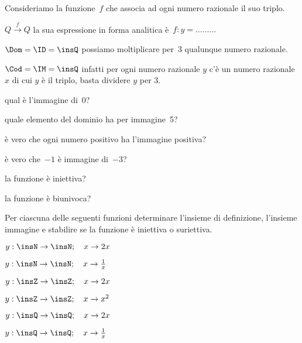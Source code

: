 \begin{esercizio}
 \label{ese:D.10}
Consideriamo la funzione~$f$ che associa ad ogni numero razionale il suo triplo.

$Q\overset{{f}}{{\rightarrow }}Q$ la sua espressione in forma
analitica è~$f: y = {\dots}{\dots}{\dots}$

$\Dom = \ID = \insQ$ possiamo moltiplicare per~3 qualunque numero razionale.

$\Cod = \IM =\insQ$ infatti per ogni numero razionale $y$ c'è un numero 
razionale $x$ di cui $y$ è il triplo, basta dividere $y$ per 3.
%
\vspace{-6pt}
\begin{enumeratea}
\item qual è l'immagine di~0?\dotfill
\item quale elemento del dominio ha per immagine~5?\dotfill
\item è vero che ogni numero positivo ha l'immagine positiva?\dotfill
\item è vero che~$-1$ è immagine di~$-3$?\dotfill
\item la funzione è iniettiva?
\item la funzione è biunivoca?
\end{enumeratea}
\end{esercizio}

\newpage %

\begin{esercizio}
 \label{ese:D.11}
Per ciascuna delle seguenti funzioni determinare l'insieme di definizione, 
l'insieme
immagine e stabilire se la funzione è iniettiva o suriettiva.
\begin{multicols}{3}
\begin{enumeratea}
\item $y:\insN\rightarrow\insN;\quad x \rightarrow 2x$
\item $y:\insN\rightarrow\insN;\quad x \rightarrow \frac{1}{x}$
\item $y:\insZ\rightarrow\insZ;\quad x \rightarrow 2x$
\item $y:\insZ\rightarrow\insZ;\quad x \rightarrow x^{2}$
\item $y:\insQ\rightarrow\insQ;\quad x \rightarrow 2x$
\item $y:\insQ\rightarrow\insQ;\quad x \rightarrow \frac{1}{x}$
\end{enumeratea}
\end{multicols}
\end{esercizio}

